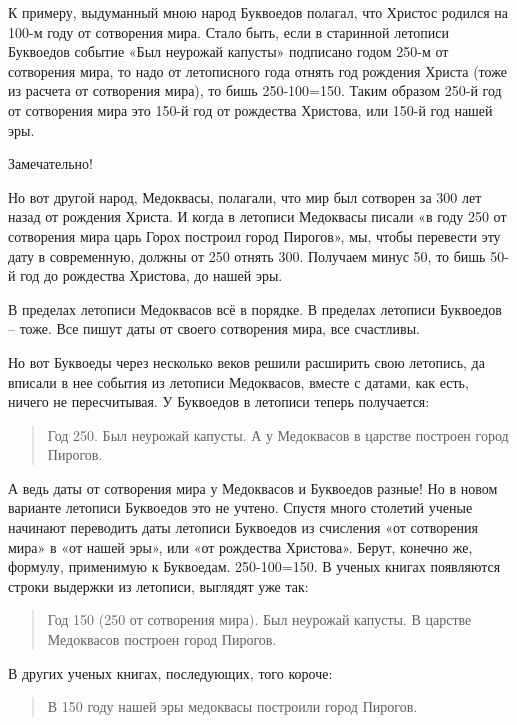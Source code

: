 К примеру, выдуманный мною народ Буквоедов полагал, что Христос родился на 100-м году от сотворения мира. Стало быть, если в старинной летописи Буквоедов событие «Был неурожай капусты» подписано годом 250-м от сотворения мира, то надо от летописного года отнять год рождения Христа (тоже из расчета от сотворения мира), то бишь 250-100=150. Таким образом 250-й год от сотворения мира это 150-й год от рождества Христова, или 150-й год нашей эры.

Замечательно!

Но вот другой народ, Медоквасы, полагали, что мир был сотворен за 300 лет назад от рождения Христа. И когда в летописи Медоквасы писали «в году 250 от сотворения мира царь Горох построил город Пирогов», мы, чтобы перевести эту дату в современную, должны от 250 отнять 300. Получаем минус 50, то бишь 50-й год до рождества Христова, до нашей эры.

В пределах летописи Медоквасов всё в порядке. В пределах летописи Буквоедов – тоже. Все пишут даты от своего сотворения мира, все счастливы.

Но вот Буквоеды через несколько веков решили расширить свою летопись, да вписали в нее события из летописи Медоквасов, вместе с датами, как есть, ничего не пересчитывая. У Буквоедов в летописи теперь получается:

\begin{quotation}
Год 250. Был неурожай капусты. А у Медоквасов в царстве построен город Пирогов.
\end{quotation}

А ведь даты от сотворения мира у Медоквасов и Буквоедов разные! Но в новом варианте летописи Буквоедов это не учтено. Спустя много столетий ученые начинают переводить даты летописи Буквоедов из счисления «от сотворения мира» в «от нашей эры», или «от рождества Христова». Берут, конечно же, формулу, применимую к Буквоедам. 250-100=150. В ученых книгах появляются строки выдержки из летописи, выглядят уже так:

\begin{quotation}
Год 150 (250 от сотворения мира). Был неурожай капусты. В царстве Медоквасов построен город Пирогов.
\end{quotation}

В других ученых книгах, последующих, того короче:

\begin{quotation}
В 150 году нашей эры медоквасы построили город Пирогов.
\end{quotation}

